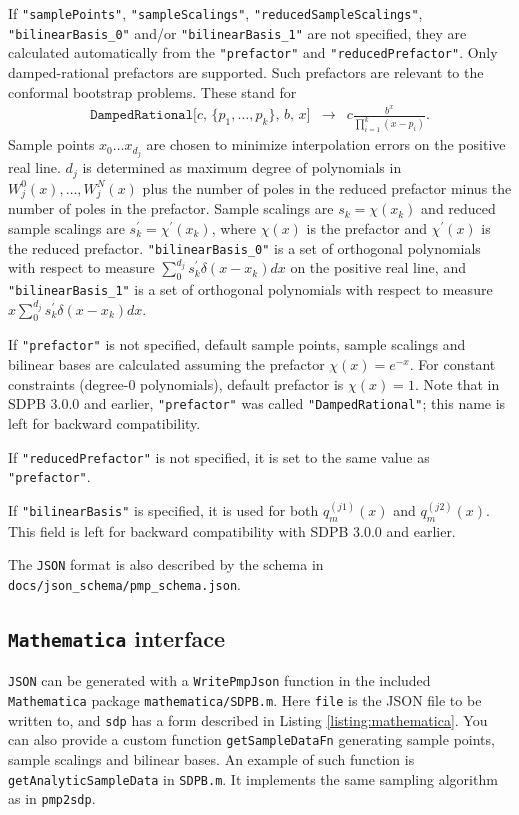 \documentclass[12pt]{article}
\numberwithin{equation}{section}
\renewcommand{\be}{\begin{eqnarray}}
\renewcommand{\ee}{\end{eqnarray}}
\begin{document}
If \texttt{"samplePoints"}, \texttt{"sampleScalings"}, \texttt{"reducedSampleScalings"}, \texttt{"bilinearBasis\_0"} and/or  \texttt{"bilinearBasis\_1"} are not specified,
they are calculated automatically from the \texttt{"prefactor"} and \texttt{"reducedPrefactor"}.
Only damped-rational prefactors are supported.
Such prefactors are relevant to the conformal bootstrap problems.
These stand for
\be
\texttt{DampedRational[$c$, \{$p_1,\dots,p_k$\}, $b$, $x$]} &\to& c\frac{b^x}{\prod_{i=1}^k (x-p_i)}.
\ee
Sample points $x_0 \ldots x_{d_j}$ are chosen to minimize interpolation errors on the positive real line.
$d_j$ is determined as maximum degree of polynomials in $W^0_j(x),\dots,W^N_j(x)$ plus the number of poles in the reduced prefactor minus the number of poles in the prefactor.
Sample scalings are $s_k = \chi(x_k)$ and reduced sample scalings are $s^\prime_k = \chi^\prime(x_k)$,
where $\chi(x)$ is the prefactor and $\chi^\prime(x)$ is the reduced prefactor.
\texttt{"bilinearBasis\_0"} is a set of orthogonal polynomials with respect to measure $\sum_{0}^{d_j}s^\prime_k \delta(x-x_k)dx$ on the positive real line, and \texttt{"bilinearBasis\_1"} is a set of orthogonal polynomials with respect to measure $x\sum_{0}^{d_j}s^\prime_k \delta(x-x_k)dx$.

If \texttt{"prefactor"} is not specified, default sample points, sample scalings and bilinear bases are calculated assuming the prefactor $\chi(x) = e^{-x}$. For constant constraints (degree-0 polynomials), default prefactor is $\chi(x) = 1$.
Note that in SDPB 3.0.0 and earlier, \texttt{"prefactor"} was called \texttt{"DampedRational"}; this name is left for backward compatibility.

If \texttt{"reducedPrefactor"} is not specified, it is set to the same value as \texttt{"prefactor"}.


If \texttt{"bilinearBasis"} is specified, it is used for both $q_m^{(j1)}(x)$ and $q_m^{(j2)}(x)$. This field is left for backward compatibility with SDPB 3.0.0 and earlier.

The \texttt{JSON} format is also described by the schema in \texttt{docs/json\_schema/pmp\_schema.json}.

\subsection{\texttt{Mathematica} interface}

\texttt{JSON} can be generated with a \texttt{WritePmpJson} function in the included \texttt{Mathematica} package \texttt{mathematica/SDPB.m}.
Here \texttt{file} is the JSON file to be written to, and \texttt{sdp} has a form described in Listing \ref{listing:mathematica}.
You can also provide a custom function \texttt{getSampleDataFn} generating sample points, sample scalings and bilinear bases.
An example of such function is \texttt{getAnalyticSampleData} in \texttt{SDPB.m}.
It implements the same sampling algorithm as in \texttt{pmp2sdp}.
\end{document}
